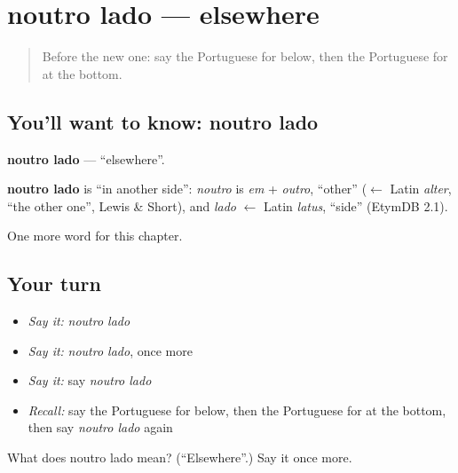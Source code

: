 \section[noutro lado]{noutro lado — elsewhere}

\label{lesson:PT-C151-noutro-lado}



\begin{quote}
Before the new one: say the Portuguese for below, then the Portuguese for at the bottom.
\end{quote}

\subsection*{You'll want to know: noutro lado}
\textbf{noutro lado} — \textquotedblleft{}elsewhere\textquotedblright{}.

\begin{cousinweb}
\textbf{noutro lado} is \textquotedblleft{}in another side\textquotedblright{}: \emph{noutro} is \emph{em} + \emph{outro}, \textquotedblleft{}other\textquotedblright{} ($\leftarrow$ Latin \emph{alter}, \textquotedblleft{}the other one\textquotedblright{}, Lewis \& Short), and \emph{lado} $\leftarrow$ Latin \emph{latus}, \textquotedblleft{}side\textquotedblright{} (EtymDB 2.1).
\end{cousinweb}

\begin{grammarlens}[title={What you've built}]
One more word for this chapter.
\end{grammarlens}

\subsection*{Your turn}
\begin{itemize}
\raggedright
  \item \emph{Say it:} \emph{noutro lado}
  \item \emph{Say it:} \emph{noutro lado}, once more
  \item \emph{Say it:} say \emph{noutro lado}
  \item \emph{Recall:} say the Portuguese for below, then the Portuguese for at the bottom, then say \emph{noutro lado} again
\end{itemize}

\begin{tcolorbox}[breakable,colback=teal!4,colframe=teal!35!black,title={Before you move on}]
What does noutro lado mean? (\textquotedblleft{}Elsewhere\textquotedblright{}.) Say it once more.
\end{tcolorbox}
